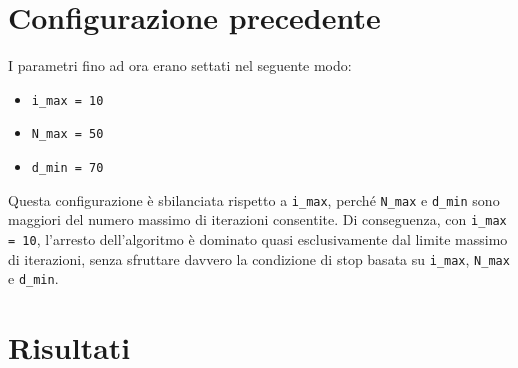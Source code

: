 \documentclass[a4paper,12pt]{article}
\begin{document}
\section{Configurazione precedente}

I parametri fino ad ora erano settati nel seguente modo:

\begin{itemize}[leftmargin=1.5cm]
    \item \texttt{i\_max = 10}
    \item \texttt{N\_max = 50}
    \item \texttt{d\_min = 70}
\end{itemize}

Questa configurazione è sbilanciata rispetto a \texttt{i\_max}, perché \texttt{N\_max} 
e \texttt{d\_min} sono maggiori del numero massimo di iterazioni consentite. 
Di conseguenza, con \texttt{i\_max = 10}, l'arresto dell'algoritmo è dominato quasi 
esclusivamente dal limite massimo di iterazioni, senza sfruttare davvero la condizione 
di stop basata su \texttt{i\_max}, \texttt{N\_max} e \texttt{d\_min}.

\section{Risultati}
\end{document}
